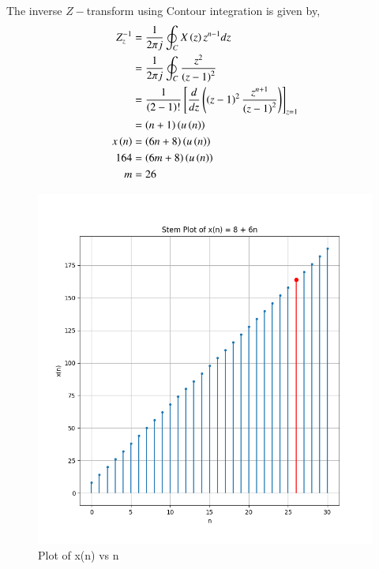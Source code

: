 \documentclass[journal,12pt,twocolumn]{IEEEtran}
\begin{document}
The inverse $Z-$transform using Contour integration is given by,
\begin{align}
    Z_z^{-1} &= \frac{1}{2\pi j}\oint_C X\left(z\right)z^{n-1}dz\\
    &= \frac{1}{2\pi j}\oint_C \frac{z^2}{\left(z-1\right)^2}\\
    &= \frac{1}{\left(2-1\right)!}\left[ \frac{d}{dz}\left(\left(z-1\right)^2 \frac{z^{n+1}}{\left(z-1\right)^2}\right) \right]_{z=1}\\
    &= \left(n+1\right)\left(u\left(n\right)\right)\\
    x\left(n\right) &= \left(6n+8\right)\left(u\left(n\right)\right)\\
    164 &= \left(6m+8\right)\left(u\left(n\right)\right)\\
    m &= 26
\end{align}




\begin{figure}[htbp]
    \centering
    \includegraphics[width=1.0\columnwidth]{figs/Figure_1.png}
    \caption{Plot of x(n) vs n}
    \label{fig:11.9.2.13.1}
\end{figure}

%
\end{document}
